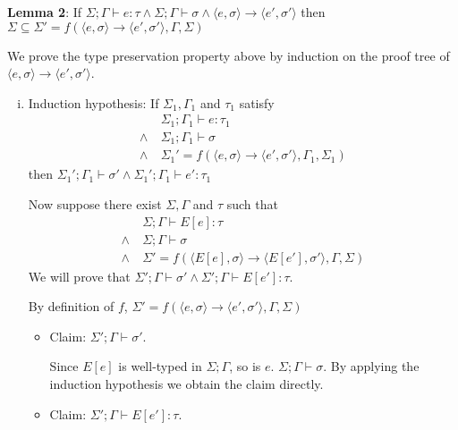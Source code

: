 \begin{enumerate}[(a)]

\textbf{Lemma 2}: If $\Sigma;\Gamma \vdash e : \tau \wedge\Sigma;\Gamma \vdash \sigma \wedge \langle e, \sigma \rangle \rightarrow \langle e', \sigma' \rangle$ then $\Sigma \subseteq \Sigma' =  f(\langle e, \sigma \rangle \rightarrow \langle e', \sigma' \rangle, \Gamma, \Sigma)$

We prove the type preservation property above by induction on the proof tree of $\langle e, \sigma \rangle \rightarrow \langle e', \sigma' \rangle$.

\begin{enumerate}[i.]
\item 

  Induction hypothesis: If $\Sigma_1, \Gamma_1$ and $\tau_1$ satisfy
  \begin{align*}
  &\Sigma_1;\Gamma_1 \vdash e : \tau_1 \\
  \wedge~&\Sigma_1;\Gamma_1 \vdash \sigma\\
  \wedge~&\Sigma_1' = f(\langle e, \sigma \rangle \rightarrow \langle e', \sigma' \rangle, \Gamma_1, \Sigma_1)
  \end{align*}
then $\Sigma_1';\Gamma_1 \vdash \sigma' \wedge \Sigma_1';\Gamma_1 \vdash e' : \tau_1$

Now suppose there exist $\Sigma, \Gamma$ and $\tau$ such that
\begin{align*}
&\Sigma;\Gamma \vdash E[e] : \tau \\
\wedge~&\Sigma;\Gamma \vdash \sigma\\
\wedge~&\Sigma' = f(\langle E[e], \sigma \rangle \rightarrow \langle E[e'], \sigma' \rangle, \Gamma, \Sigma)
\end{align*}
We will prove that $\Sigma';\Gamma \vdash \sigma' \wedge \Sigma';\Gamma \vdash E[e'] : \tau$.

By definition of $f$, $\Sigma' = f(\langle e, \sigma \rangle \rightarrow \langle e', \sigma' \rangle, \Gamma, \Sigma)$

\begin{itemize}
\item Claim: $\Sigma';\Gamma \vdash \sigma'$.

Since $E[e]$ is well-typed in $\Sigma; \Gamma$, so is $e$. $\Sigma;\Gamma \vdash \sigma$. By applying the induction hypothesis we obtain the claim directly.
\item Claim: $\Sigma';\Gamma \vdash E[e'] : \tau$.


\end{itemize}
\end{enumerate}
\end{enumerate}
